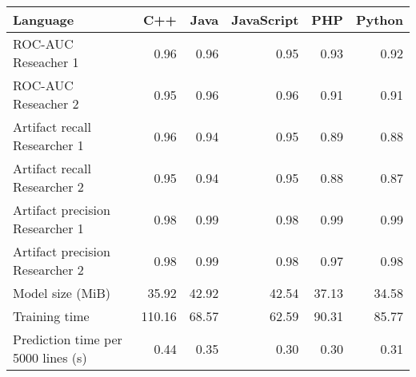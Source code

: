 \begin{tabular}{lrrrrr}
\toprule
Language &    C++ &  Java &  JavaScript &   PHP &  Python \\
\midrule
ROC-AUC Reseacher 1                &   0.96 &  0.96 &        0.95 &  0.93 &    0.92 \\
ROC-AUC Reseacher 2                &   0.95 &  0.96 &        0.96 &  0.91 &    0.91 \\
Artifact recall Researcher 1       &   0.96 &  0.94 &        0.95 &  0.89 &    0.88 \\
Artifact recall Researcher 2       &   0.95 &  0.94 &        0.95 &  0.88 &    0.87 \\
Artifact precision Researcher 1    &   0.98 &  0.99 &        0.98 &  0.99 &    0.99 \\
Artifact precision Researcher 2    &   0.98 &  0.99 &        0.98 &  0.97 &    0.98 \\
Model size (MiB)                   &  35.92 & 42.92 &       42.54 & 37.13 &   34.58 \\
Training time                      & 110.16 & 68.57 &       62.59 & 90.31 &   85.77 \\
Prediction time per 5000 lines (s) &   0.44 &  0.35 &        0.30 &  0.30 &    0.31 \\
\bottomrule
\end{tabular}
